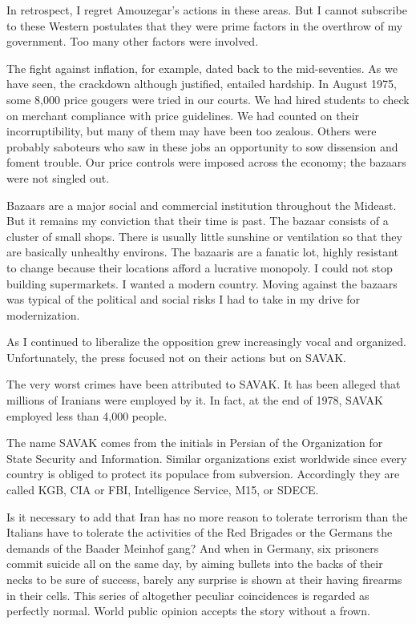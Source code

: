 In retrospect, I regret Amouzegar's actions in these areas. But I cannot subscribe to these Western postulates that they were prime factors in the overthrow of my government. Too many other factors were involved. 

The fight against inflation, for example, dated back to the mid-seventies. As we have seen, the crackdown although justified, entailed hardship. In August 1975, some 8,000 price gougers were tried in our courts. We had hired students to check on merchant compliance with price guidelines. We had counted on their incorruptibility, but many of them may have been too zealous. Others were probably saboteurs who saw in these jobs an opportunity to sow dissension and foment trouble. Our price controls were imposed across the economy; the bazaars were not singled out. 

Bazaars are a major social and commercial institution throughout the Mideast. But it remains my conviction that their time is past. The bazaar consists of a cluster of small shops. There is usually little sunshine or ventilation so that they are basically unhealthy environs. The bazaaris are a fanatic lot, highly resistant to change because their locations afford a lucrative monopoly. I could not stop building supermarkets. I wanted a modern country. Moving against the bazaars was typical of the political and social risks I had to take in my drive for modernization. 

As I continued to liberalize the opposition grew increasingly vocal and organized. Unfortunately, the press focused not on their actions but on SAVAK. 

The very worst crimes have been attributed to SAVAK. It has been alleged that millions of Iranians were employed by it. In fact, at the end of 1978, SAVAK employed less than 4,000 people. 

The name SAVAK comes from the initials in Persian of the Organization for State Security and Information. Similar organizations exist worldwide since every country is obliged to protect its populace from subversion. Accordingly they are called KGB, CIA or FBI, Intelligence Service, M15, or SDECE. 

Is it necessary to add that Iran has no more reason to tolerate terrorism than the Italians have to tolerate the activities of the Red Brigades or the Germans the demands of the Baader Meinhof gang? And when in Germany, six prisoners commit suicide all on the same day, by aiming bullets into the backs of their necks to be sure of success, barely any surprise is shown at their having firearms in their cells. This series of altogether peculiar coincidences is regarded as perfectly normal. World public opinion accepts the story without a frown. 

